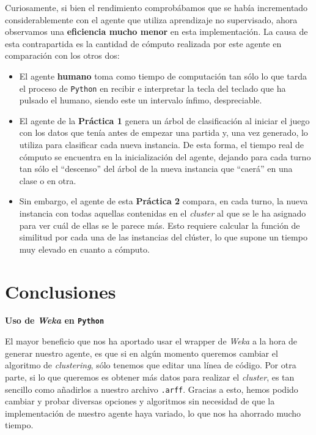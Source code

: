 \documentclass[12pt]{article}
\begin{document}
Curiosamente, si bien el rendimiento comprobábamos que se había incrementado considerablemente con el agente que utiliza aprendizaje no supervisado, ahora observamos una \textbf{eficiencia mucho menor} en esta implementación. La causa de esta contrapartida es la cantidad de cómputo realizada por este agente en comparación con los otros dos:
\begin{itemize}
    \item El agente \textbf{humano} toma como tiempo de computación tan sólo lo que tarda el proceso de \texttt{Python} en recibir e interpretar la tecla del teclado que ha pulsado el humano, siendo este un intervalo ínfimo, despreciable.
    \item El agente de la \textbf{Práctica 1} genera un árbol de clasificación al iniciar el juego con los datos que tenía antes de empezar una partida y, una vez generado, lo utiliza para clasificar cada nueva instancia. De esta forma, el tiempo real de cómputo se encuentra en la inicialización del agente, dejando para cada turno tan sólo el ``descenso'' del árbol de la nueva instancia que ``caerá'' en una clase o en otra.
    \item Sin embargo, el agente de esta \textbf{Práctica 2} compara, en cada turno, la nueva instancia con todas aquellas contenidas en el \textit{cluster} al que se le ha asignado para ver cuál de ellas se le parece más. Esto requiere calcular la función de similitud por cada una de las instancias del clúster, lo que supone un tiempo muy elevado en cuanto a cómputo.
\end{itemize}




\newpage
\section{Conclusiones}

\centerline{\textbf{Uso de \textit{Weka} en \texttt{Python}}}
\vspace{0.5cm}

El mayor beneficio que nos ha aportado usar el wrapper de \textit{Weka} a la hora de generar nuestro agente, es que si en algún momento queremos cambiar el algoritmo de \textit{clustering}, sólo tenemos que editar una línea de código. Por otra parte, si lo que queremos es obtener más datos para realizar el \textit{cluster}, es tan sencillo como añadirlos a nuestro archivo \texttt{.arff}. Gracias a esto, hemos podido cambiar y probar diversas opciones y algoritmos sin necesidad de que la implementación de nuestro agente haya variado, lo que nos ha ahorrado mucho tiempo.
\end{document}
